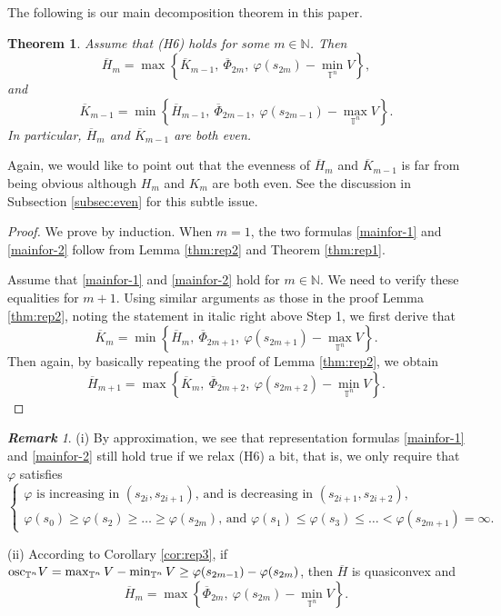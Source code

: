 \documentclass[12pt,reqno]{amsart}
\theoremstyle{plain}
\newtheorem{thm}{Theorem}[section]
\theoremstyle{remark}
\newtheorem{rem}{\bf{Remark}}
\numberwithin{equation}{section}
\newcommand{\N}{\mathbb{N}}
\newcommand{\T}{\mathbb{T}}
\newcommand{\ol}{\overline}
\begin{document}
\medskip


The following is our main decomposition theorem in this paper. 

\begin{thm}\label{Maintheorem}  Assume that {\rm (H6)} holds for some $m\in \N$. Then
\begin{equation}\label{mainfor-1}
 \ol{H}_m=\max\left\{\ol{K}_{m-1}, \  \ol{\Phi}_{2m},\ \varphi(s_{2m})-\min_{\T^n}V\right\},
\end{equation}
and
\begin{equation}\label{mainfor-2}
\ol{K}_{m-1}=\min\left\{\ol{H}_{m-1}, \  \ol{\Phi}_{2m-1},\ \varphi(s_{2m-1})-\max_{\T^n}V\right\}.
\end{equation}
In particular,  $ \ol{H}_m$ and $ \ol{K}_{m-1}$ are both even. 
\end{thm}

Again,  we would like to point out that the evenness of $ \ol{H}_m$ and $ \ol{K}_{m-1}$ is far from being obvious although $H_m$ and $K_m$ are both even. 
See the discussion in Subsection \ref{subsec:even} for this subtle issue. 

\begin{proof}
We prove by induction. 
When $m=1$, the two formulas  \eqref{mainfor-1} and \eqref{mainfor-2}  follow from Lemma \ref{thm:rep2} and Theorem \ref{thm:rep1}.

Assume that \eqref{mainfor-1} and \eqref{mainfor-2} hold for $m \in \N$.  We need to verify these equalities for $m+1$. 
Using similar arguments as those in the proof Lemma \ref{thm:rep2}, noting  the statement in italic right above Step 1, we first derive that 
\[
\ol{K}_{m}=\min\left\{\ol{H}_{m}, \  \ol{\Phi}_{2m+1},\ \varphi(s_{2m+1})-\max_{\T^n}V\right\}.
\]
Then again, by basically repeating the proof of  Lemma \ref{thm:rep2}, we obtain
\[
 \ol{H}_{m+1}=\max\left\{\ol{K}_{m}, \  \ol{\Phi}_{2m+2},\ \varphi(s_{2m+2})-\min_{\T^n}V\right\}.
\]
\end{proof}



\begin{rem}\label{rem:flat}  
(i) By approximation, we see that representation formulas \eqref{mainfor-1} and \eqref{mainfor-2} still hold true if we relax (H6) a bit, that is, we only require that
$\varphi$ satisfies
\[
\begin{cases}
\text{$\varphi$ is  increasing in $(s_{2i},s_{2i+1})$, and is decreasing in $(s_{2i+1},s_{2i+2})$,}\\
\text{$\varphi(s_0) \geq \varphi(s_2) \geq \ldots \geq  \varphi(s_{2m})$, and $\varphi(s_1) \leq \varphi(s_3) \leq \ldots < \varphi(s_{2m+1})=\infty$.}
\end{cases}
\]

(ii) According to Corollary  \ref{cor:rep3},  if ${\rm osc}_{\T^n}V =\max_{\T ^n}V-\min_{\T^n}V\geq \varphi(s_{2m-1})-\varphi(s_{2m})$, then $\ol H$ is quasiconvex and 
\[
\ol H_m=\max\left\{\ol \Phi_{2m}, \ \varphi(s_{2m})-\min_{\T^n}V\right\}.
\]

\end{rem}
\end{document}
